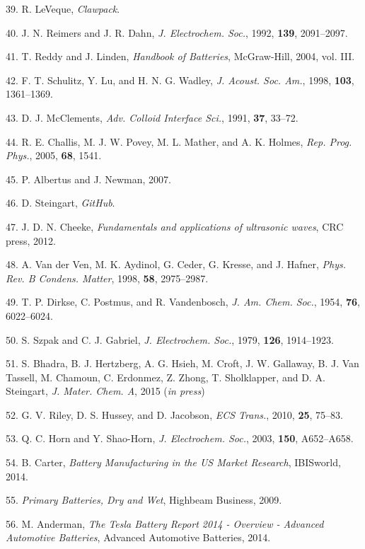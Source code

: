 \documentclass[]{article}
\begin{document}
39.{ }R. LeVeque, \emph{Clawpack}.

40.{ }J. N. Reimers and J. R. Dahn, \emph{J. Electrochem. Soc.}, 1992,
\textbf{139}, 2091--2097.

41.{ }T. Reddy and J. Linden, \emph{Handbook of Batteries}, McGraw-Hill,
2004, vol. III.

42.{ }F. T. Schulitz, Y. Lu, and H. N. G. Wadley, \emph{J. Acoust. Soc.
Am.}, 1998, \textbf{103}, 1361--1369.

43.{ }D. J. McClements, \emph{Adv. Colloid Interface Sci.}, 1991,
\textbf{37}, 33--72.

44.{ }R. E. Challis, M. J. W. Povey, M. L. Mather, and A. K. Holmes,
\emph{Rep. Prog. Phys.}, 2005, \textbf{68}, 1541.

45.{ }P. Albertus and J. Newman, 2007.

46.{ }D. Steingart, \emph{GitHub}.

47.{ }J. D. N. Cheeke, \emph{Fundamentals and applications of ultrasonic
waves}, CRC press, 2012.

48.{ }A. Van der Ven, M. K. Aydinol, G. Ceder, G. Kresse, and J. Hafner,
\emph{Phys. Rev. B Condens. Matter}, 1998, \textbf{58}, 2975--2987.

49.{ }T. P. Dirkse, C. Postmus, and R. Vandenbosch, \emph{J. Am. Chem.
Soc.}, 1954, \textbf{76}, 6022--6024.

50.{ }S. Szpak and C. J. Gabriel, \emph{J. Electrochem. Soc.}, 1979,
\textbf{126}, 1914--1923.

51.{ }S. Bhadra, B. J. Hertzberg, A. G. Hsieh, M. Croft, J. W. Gallaway,
B. J. Van Tassell, M. Chamoun, C. Erdonmez, Z. Zhong, T. Sholklapper,
and D. A. Steingart, \emph{J. Mater. Chem. A}, 2015 (\emph{in press})

52.{ }G. V. Riley, D. S. Hussey, and D. Jacobson, \emph{ECS Trans.},
2010, \textbf{25}, 75--83.

53.{ }Q. C. Horn and Y. Shao-Horn, \emph{J. Electrochem. Soc.}, 2003,
\textbf{150}, A652--A658.

54.{ }B. Carter, \emph{Battery Manufacturing in the US Market Research},
IBISworld, 2014.

55.{ }\emph{Primary Batteries, Dry and Wet}, Highbeam Business, 2009.

56.{ }M. Anderman, \emph{The Tesla Battery Report 2014 - Overview -
Advanced Automotive Batteries}, Advanced Automotive Batteries, 2014.
\end{document}
